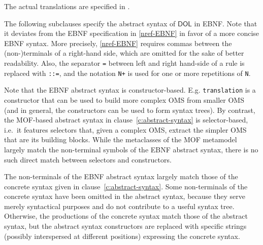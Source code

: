 \documentclass[10pt, a4paper]{isov2}
\makeatletter
\newcommand*\CommentAuthor{}
\renewcommand*\CommentAuthor{#1}}
\newcommand*\CommentDate{}
\renewcommand*\CommentDate{#1}}
\newcommand*\CommentId{}
\renewcommand*\CommentId{#1}}
\newcommand*\CommentType{}
\renewcommand*\CommentType{#1}}
\newcommand*{\SetCommentColorByType}[1]{%
\edef\localType{{#1}}%
\expandafter\ifstrequal\localType{q-aut}{\colorlet{CommentColor}{red}}{%
\expandafter\ifstrequal\localType{q-all}{\colorlet{CommentColor}{orange}}{%
\expandafter\ifstrequal\localType{todo}{\colorlet{CommentColor}{orange}}{%
\expandafter\ifstrequal\localType{fyi}{\colorlet{CommentColor}{lightgray}}{%
\colorlet{CommentColor}{yellow}}}}}}
\newcommand*{\SetCommentPrefixByType}[1]{%
\edef\localType{{#1}}%
\expandafter\@ifmtarg\localType{%
\edef\CommentPrefix{}%
}{%
\caseupper[q]{#1}%
\edef\CommentPrefix{\thestring: }%
}}
\newcommand*{\initComment}[1]{%
\setkeys{Comment}{#1}%
\SetCommentColorByType{\CommentType}%
\relax%
\SetCommentPrefixByType{\CommentType}%
\relax%
}
\newcommand*{\todonote}[2][]{%
\initComment{#1}%
\pdfcomment[author=\CommentAuthor,color=CommentColor,date=\CommentDate,id=\CommentId]{%
\CommentPrefix
#2}}
\renewcommand*{\todonote}[2][]{%
\initComment{#1}%
\ednote{\CommentPrefix #2}}
\newcommand*{\syntax}[1]{\texttt{#1}}
\newcommand*{\IS}{OMG Specification\xspace}
\newcommand*{\DOL}{\ensuremath{\mathsf{DOL}}\xspace}
\renewcommand{\noterefname}{note}
\renewcommand{\nref}[1]{\noterefname~\ref{#1}}
\renewcommand{\nref}[1]{\ref{nref-#1}}
\makeatother
\begin{document}
The actual translations are specified in \cite{OntoGraph}.



\cleardoublepage
\infannex{\DOL Abstract Syntax in EBNF}
\label{a:EBNF}

The following subclauses specify the abstract syntax of \DOL in EBNF. Note that it deviates from the EBNF specification in
 \nref{EBNF} in favor of a more concise
EBNF syntax. More precisely, \nref{EBNF} requires commas between the (non-)terminals of a right-hand side, which are omitted 
for the sake of better readability. Also, the separator \syntax{=}
between left and right hand-side of a rule is replaced with \syntax{::=}, and 
 the notation \syntax{N+} is used 
for one or more repetitions of \syntax{N}.

Note that the EBNF abstract syntax is constructor-based.
E.g. \syntax{translation} is a constructor that can be used to build
more complex OMS from smaller OMS (and in general, the constructors
can be used to form syntax trees). By contrast, the MOF-based abstract
syntax in clause~\ref{c:abstract-syntax} is selector-based, i.e.\ it
features selectors that, given a complex OMS, extract the simpler OMS
that are its building blocks. While the metaclasses of the MOF
metamodel largely match the non-terminal symbols of the EBNF abstract
syntax, there is no such direct match between selectors and
constructors.

The non-terminals of the EBNF abstract syntax largely match those of
the concrete syntax given in clause~\ref{c:abstract-syntax}. Some
non-terminals of the concrete syntax have been omitted in the abstract 
syntax, because they serve merely syntactical purposes and do not
contribute to a useful syntax tree. Otherwise, the productions of
the concrete syntax match those of the abstract syntax, but the
abstract syntax constructors are replaced with specific strings
(possibly interspersed at different positions) expressing the
concrete syntax.
\end{document}
